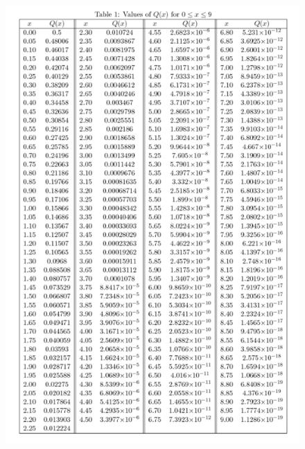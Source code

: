         \begin{figure}[H]
            \centering
            \includegraphics[width = \textwidth]{media/tabella funzione q.png}
        \end{figure}
